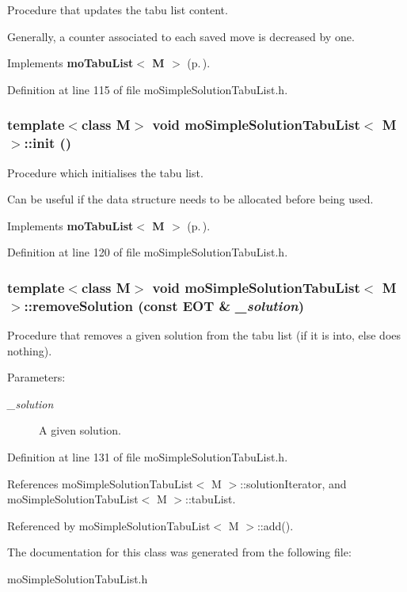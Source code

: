 Procedure that updates the tabu list content. 

Generally, a counter associated to each saved move is decreased by one. 

Implements {\bf mo\-Tabu\-List$<$ M $>$} {\rm (p.\,\pageref{classmo_tabu_list_a1})}.

Definition at line 115 of file mo\-Simple\-Solution\-Tabu\-List.h.
\subsubsection{\setlength{\rightskip}{0pt plus 5cm}template$<$class M$>$ void {\bf mo\-Simple\-Solution\-Tabu\-List}$<$ M $>$::init ()\hspace{0.3cm}{\tt  [inline, virtual]}}\label{classmo_simple_solution_tabu_list_a4}


Procedure which initialises the tabu list. 

Can be useful if the data structure needs to be allocated before being used. 

Implements {\bf mo\-Tabu\-List$<$ M $>$} {\rm (p.\,\pageref{classmo_tabu_list_a2})}.

Definition at line 120 of file mo\-Simple\-Solution\-Tabu\-List.h.
\subsubsection{\setlength{\rightskip}{0pt plus 5cm}template$<$class M$>$ void {\bf mo\-Simple\-Solution\-Tabu\-List}$<$ M $>$::remove\-Solution (const {\bf EOT} \& {\em \_\-solution})\hspace{0.3cm}{\tt  [inline, private]}}\label{classmo_simple_solution_tabu_list_d0}


Procedure that removes a given solution from the tabu list (if it is into, else does nothing). 

\begin{Desc}
\item[Parameters:]
\begin{description}
\item[{\em \_\-solution}]A given solution. \end{description}
\end{Desc}


Definition at line 131 of file mo\-Simple\-Solution\-Tabu\-List.h.

References mo\-Simple\-Solution\-Tabu\-List$<$ M $>$::solution\-Iterator, and mo\-Simple\-Solution\-Tabu\-List$<$ M $>$::tabu\-List.

Referenced by mo\-Simple\-Solution\-Tabu\-List$<$ M $>$::add().

The documentation for this class was generated from the following file:\begin{CompactItemize}
\item 
mo\-Simple\-Solution\-Tabu\-List.h\end{CompactItemize}
